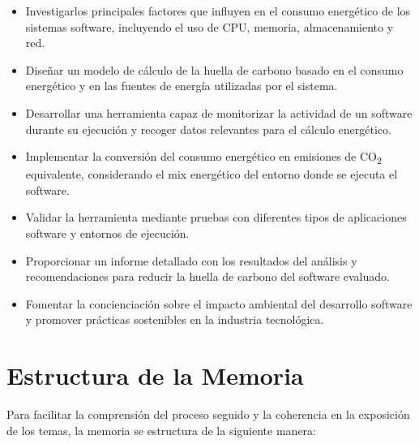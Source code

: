 \documentclass[12pt,a4paper]{report}
\begin{document}
\begin{itemize}
  \item Investigarlos principales factores que influyen en el consumo
        energético de los sistemas software, incluyendo el uso de CPU, memoria,
        almacenamiento y red.
  \item Diseñar un modelo de cálculo de la huella de carbono basado en el consumo
        energético y en las fuentes de energía utilizadas por el sistema.
  \item Desarrollar una herramienta capaz de monitorizar la actividad de un software
        durante su ejecución y recoger datos relevantes para el cálculo energético.
  \item Implementar la conversión del consumo energético en emisiones de
        CO\textsubscript{2} equivalente, considerando el mix energético del entorno
        donde se ejecuta el software.
  \item Validar la herramienta mediante pruebas con diferentes tipos de aplicaciones
        software y entornos de ejecución.
  \item Proporcionar un informe detallado con los resultados del análisis y
        recomendaciones para reducir la huella de carbono del software evaluado.
  \item Fomentar la concienciación sobre el impacto ambiental del desarrollo software y
        promover prácticas sostenibles en la industria tecnológica.
\end{itemize}

\section{Estructura de la Memoria}

Para facilitar la comprensión del proceso seguido y la coherencia en la
exposición de los temas, la memoria se estructura de la siguiente manera:
\end{document}
